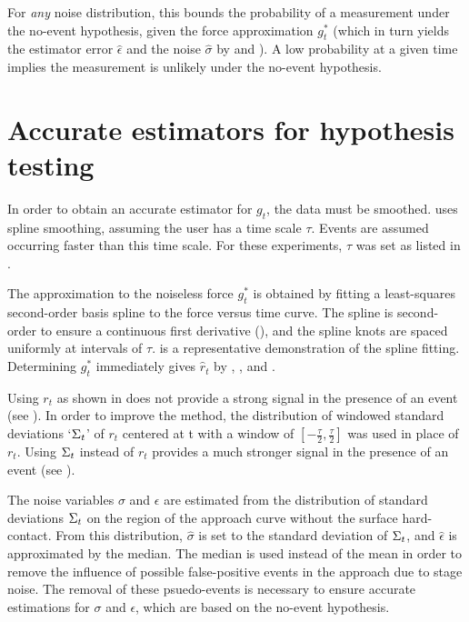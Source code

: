 

For \emph{any} noise distribution, this bounds the probability of a measurement under the no-event hypothesis, given the force approximation $g^{*}_t$ (which in turn yields the estimator error $\hat{\epsilon}$ and the noise $\hat{\sigma}$ by  and ). A low probability at a given time implies the measurement is unlikely under the no-event hypothesis. 

\section{Accurate estimators for hypothesis testing}

In order to obtain an accurate estimator for $g_t$, the data must be smoothed. \name{} uses spline smoothing, assuming the user has a time scale $\tau$. Events are assumed occurring faster than this time scale. For these experiments, $\tau$ was set as listed in .  

The approximation to the noiseless force $g^{*}_t$ is obtained by fitting a least-squares second-order basis spline to the force versus time curve. The spline is second-order to ensure a continuous first derivative (), and the spline knots are spaced uniformly at intervals of $\tau$.  is a representative demonstration of the spline fitting. Determining  $g^{*}_t$ immediately gives $\hat{r}_t$ by  , , and . 

Using $r_t$ as shown in  does not provide a strong signal in the presence of an event (see ). In order to improve the method, the distribution of windowed standard deviations `$\Sigma_t$' of $r_t$ centered at t with a window of $[-\frac{\tau}{2},\frac{\tau}{2}]$ was used in place of $r_t$. Using $\Sigma_t$ instead of $r_t$ provides a much stronger signal in the presence of an event (see ).  

The noise variables $\sigma$ and $\epsilon$ are estimated from the distribution of standard deviations $\Sigma_t$ on the region of the approach curve without the surface hard-contact. From this distribution, $\hat{\sigma}$ is set to the standard deviation of $\Sigma_t$, and $\hat{\epsilon}$ is approximated by the median. The median is used instead of the mean in order to remove the influence of possible false-positive events in the approach due to stage noise. The removal of these psuedo-events is necessary to ensure accurate estimations for $\sigma$ and $\epsilon$, which are based on the no-event hypothesis. 

